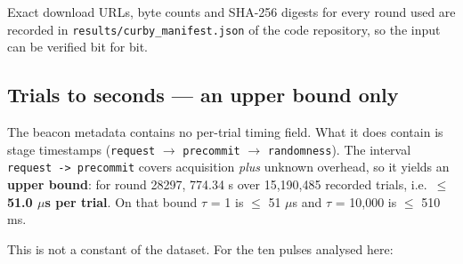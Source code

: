 \documentclass[
  11pt,
]{article}
\begin{document}
Exact download URLs, byte counts and SHA-256 digests for every round
used are recorded in \texttt{results/curby\_manifest.json} of the code
repository, so the input can be verified bit for bit.

\subsection{Trials to seconds --- an upper bound only}

The beacon metadata contains no per-trial timing field. What it does
contain is stage timestamps (\texttt{request} \(\rightarrow\)
\texttt{precommit} \(\rightarrow\) \texttt{randomness}). The interval
\texttt{request -> precommit} covers acquisition \emph{plus} unknown
overhead, so it yields an \textbf{upper bound}: for round 28297, 774.34
s over 15,190,485 recorded trials, i.e.~\textbf{\(\le\) 51.0 \(\mu\)s
per trial}. On that bound \(\tau\) = 1 is \(\le\) 51 \(\mu\)s and
\(\tau\) = 10,000 is \(\le\) 510 ms.

This is not a constant of the dataset. For the ten pulses analysed here:
\end{document}
